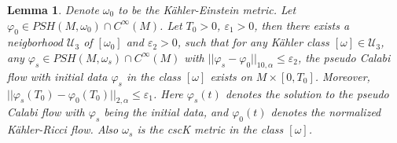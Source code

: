 \documentclass[11pt]{amsart}
\newtheorem{lem}{Lemma}[section]
\numberwithin{equation}{section}
\newcommand \eps{\varepsilon}
\begin{document}
\begin{lem}\label{l6.4}
Denote $\omega_0$ to be the K\"ahler-Einstein metric.  Let $\varphi_0\in PSH(M,\omega_0)\cap C^{\infty}(M)$.  Let $T_0>0$,  $\eps_1>0$,  then there exists a neigborhood $\mathcal{U}_3$ of $[\omega_0]$ and $\eps_2>0$,  such that for any K\"ahler class $[\omega]\in \mathcal{U}_3$,  any $\varphi_s\in PSH(M,\omega_s)\cap C^{\infty}(M)$ with $||\varphi_s-\varphi_0||_{10,\alpha}\le \eps_2$,  the pseudo Calabi flow with initial data $\varphi_s$ in the class $[\omega]$ exists on $M\times [0,T_0]$.  Moreover,  $||\varphi_s(T_0)-\varphi_0(T_0)||_{2,\alpha}\le \eps_1$.  Here $\varphi_s(t)$ denotes the solution to the pseudo Calabi flow with $\varphi_s$ being the initial data,  and $\varphi_0(t)$ denotes the normalized K\"ahler-Ricci flow.  Also $\omega_s$ is the cscK metric in the class $[\omega]$.
\end{lem}
\end{document}
